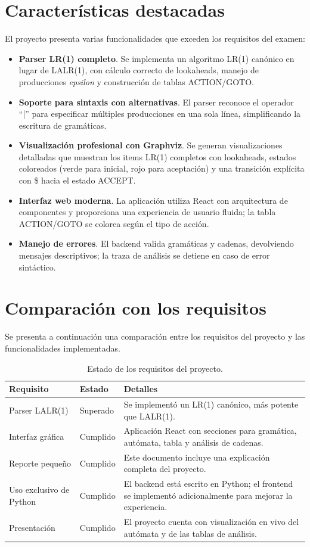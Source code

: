 \documentclass[12pt,a4paper]{article}
\begin{document}
\section{Características destacadas}

El proyecto presenta varias funcionalidades que exceden los requisitos del examen:
\begin{itemize}
  \item \textbf{Parser LR(1) completo}.  Se implementa un algoritmo LR(1) canónico en lugar de LALR(1), con cálculo correcto de lookaheads, manejo de producciones \emph{epsilon} y construcción de tablas ACTION/GOTO.
  \item \textbf{Soporte para sintaxis con alternativas}.  El parser reconoce el operador ``|'' para especificar múltiples producciones en una sola línea, simplificando la escritura de gramáticas.
  \item \textbf{Visualización profesional con Graphviz}.  Se generan visualizaciones detalladas que muestran los items LR(1) completos con lookaheads, estados coloreados (verde para inicial, rojo para aceptación) y una transición explícita con \$ hacia el estado ACCEPT.
  \item \textbf{Interfaz web moderna}.  La aplicación utiliza React con arquitectura de componentes y proporciona una experiencia de usuario fluida; la tabla ACTION/GOTO se colorea según el tipo de acción.
  \item \textbf{Manejo de errores}.  El backend valida gramáticas y cadenas, devolviendo mensajes descriptivos; la traza de análisis se detiene en caso de error sintáctico.
\end{itemize}

\section{Comparación con los requisitos}

Se presenta a continuación una comparación entre los requisitos del proyecto y las funcionalidades implementadas.

\begin{table}[h]
\centering
\begin{tabular}{p{4cm} p{3cm} p{8cm}}
\toprule
\textbf{Requisito} & \textbf{Estado} & \textbf{Detalles} \\
\midrule
Parser LALR(1) & Superado & Se implementó un LR(1) canónico, más potente que LALR(1). \\
Interfaz gráfica & Cumplido & Aplicación React con secciones para gramática, autómata, tabla y análisis de cadenas. \\
Reporte pequeño & Cumplido & Este documento incluye una explicación completa del proyecto. \\
Uso exclusivo de Python & Cumplido & El backend está escrito en Python; el frontend se implementó adicionalmente para mejorar la experiencia. \\
Presentación & Cumplido & El proyecto cuenta con visualización en vivo del autómata y de las tablas de análisis. \\
\bottomrule
\end{tabular}
\caption{Estado de los requisitos del proyecto.}
\end{table}
\end{document}

